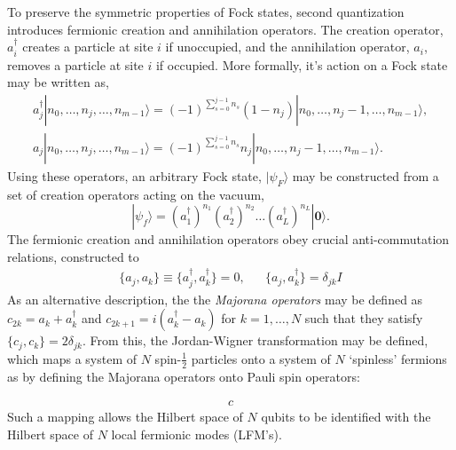 To preserve the symmetric properties of Fock states, second quantization introduces fermionic creation and annihilation operators. The creation operator, $a^{\dagger}_{i}$ creates a particle at site $i$ if unoccupied, and the annihilation operator, $a_i$, removes a particle at site $i$ if occupied. More formally, it's action on a Fock state may be written as, 
\begin{align}
    a_j^{\dagger} |n_0, \dots, n_j, \dots, n_{m-1}\rangle = {(-1)}^{\sum^{j-1}_{s=0}n_s} (1-n_j) |n_0, \dots, n_j - 1, \dots, n_{m-1}\rangle, \\
    a_j |n_0, \dots, n_j, \dots, n_{m-1}\rangle = {(-1)}^{\sum^{j-1}_{s=0}n_s} n_j |n_0, \dots, n_j - 1, \dots, n_{m-1}\rangle.
\end{align}
Using these operators, an arbitrary Fock state, $|\psi_{F}\rangle$ may be constructed from a set of creation operators acting on the vacuum, 
\begin{equation}
    |\psi_{f}\rangle = (a_{1}^{\dagger})^{n_1} (a_{2}^{\dagger})^{n_2} \dots (a_{L}^{\dagger})^{n_{L}}|{\mathbf 0}\rangle.
\end{equation}
The fermionic creation and annihilation operators obey crucial anti-commutation relations, constructed to 
\begin{align}
    \{a_j, a_k\} \equiv \{a_j^{\dagger}, a_k^{\dagger}\} = 0, && \{a_j, a_k^{\dagger}\} = \delta_{jk}I
\end{align}
As an alternative description, the the \textit{Majorana operators} may be defined as 
$c_{2k} = a_k + a_k^{\dagger}$ and $c_{2k+1} = i(a_k^{\dagger} - a_{k})$ for $k =  1, \dots, N$ such that they satisfy $\{c_j, c_k\} = 2\delta_{jk}$. From this, the Jordan-Wigner transformation may be defined, which maps a system of $N$ spin-$\frac{1}{2}$ particles onto a system of $N$ `spinless' fermions as by defining the Majorana operators onto Pauli spin operators: 

\begin{align}
    c
\end{align}
Such a mapping allows the Hilbert space of $N$ qubits to be identified with the Hilbert space of $N$ local fermionic modes (LFM's). 






